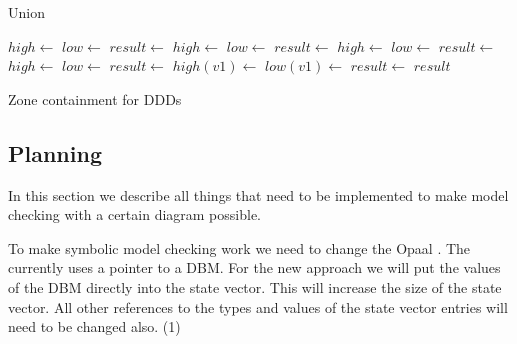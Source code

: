\begin{algorithm}
\begin{algorithmic}[1]
\caption{Union}\label{alg:union}
		\State $high \gets$ 
		\State $low \gets$ 
		\State $result \gets$  
		\State $high \gets$ 
		\State $low \gets$ 
		\State $result \gets$  
		\State $high \gets$ 
		\State $low \gets$ 
		\State $result \gets$ 
		\State $high \gets$ 
		\State $low \gets$ 
		\State $result \gets$ 
		\State $high(v1) \gets$ 
		\State $low(v1) \gets$ 
		\State $result \gets$ 
	\EndIf
	\State \Return $result$
\EndProcedure
\end{algorithmic}
\end{algorithm}

\begin{algorithm}
\caption{Zone containment for DDDs}\label{alg:contain}
\begin{algorithmic}[1]
		\State{} 
	\EndIf
\EndProcedure
\end{algorithmic}
\end{algorithm}

\subsection{Planning}
In this section we describe all things that need to be implemented to make model checking with a certain diagram possible. 

To make symbolic model checking work we need to change the Opaal \pins{}. The \pins{} currently uses a pointer to a DBM. For the new approach we will put the values of the DBM directly into the state vector. This will increase the size of the state vector. All other references to the types and values of the state vector entries will need to be changed also. (1)

